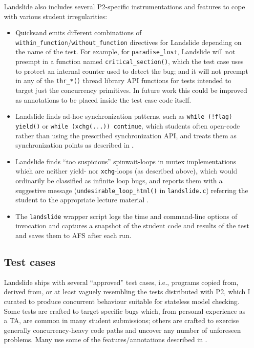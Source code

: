 \noindent Landslide also includes several P2-specific instrumentations and features to cope with various student irregularities:
\begin{itemize}
	\item Quicksand emits different combinations of {\tt within\_function}/{\tt without\_function} directives
		for Landslide depending on the name of the test.
		For example, for {\tt paradise\_\allowbreak{}lost},
		Landslide will not preempt in a function named {\tt critical\_section()},
		which the test case uses to protect an internal counter used to detect the bug;
		and it will not preempt in any of the {\tt thr\_*()} thread library API functions
		for tests intended to target just the concurrency primitives.
		In future work this could be improved as annotations to be placed inside the test case code itself.
	\item Landslide finds ad-hoc synchronization patterns,
		such as {\tt while (!flag) yield()} or {\tt while (xchg(...)) continue},
		which students often open-code rather than using the prescribed synchronization API,
		and treats them as synchronization points as described in \sect{\ref{sec:landslide-blocking}}.
	\item Landslide finds ``too suspicious'' spinwait-loops in mutex implementations
		which are neither yield- nor {\tt xchg}-loops (as described above),
		which would ordinarily be classified as infinite loop bugs,
		and reports them with a suggestive message ({\tt undesirable\_\allowbreak{}loop\_html()} in {\tt landslide.c})
		referring the student to the appropriate lecture material
		\cite{synchronization-2}.
	\item The {\tt landslide} wrapper script logs the time and command-line options of invocation
		and captures a snapshot of the student code and results of the test and saves them to AFS
		after each run.
\end{itemize}

\subsection{Test cases}
\label{sec:education-pebbles-tests}

Landslide ships with several ``approved'' test cases,
i.e., programs copied from, derived from, or at least vaguely resembling
the tests distributed with P2,
which I curated to produce concurrent behaviour suitable for stateless model checking.
Some tests are crafted to target specific bugs which,
from personal experience as a TA, are common in many student submissions;
others are crafted to exercise generally concurrency-heavy code paths and uncover any number of unforeseen problems.
Many use some of the features/annotations described in \sect{\ref{sec:landslide-testcases}}.

